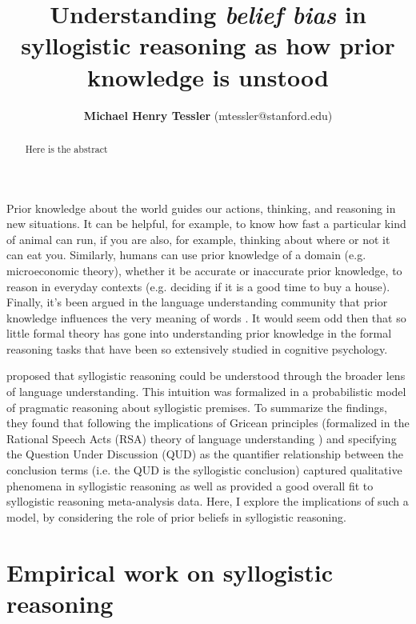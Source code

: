 \documentclass{llncs} %
\title{Understanding \emph{belief bias} in syllogistic reasoning as how prior knowledge is unstood}
\author{{\large \bf Michael Henry Tessler} (mtessler@stanford.edu)}
\institute{Department of Psychology, Stanford University}
\begin{document}
\maketitle


\begin{abstract}
Here is the abstract
\end{abstract}

Prior knowledge about the world guides our actions, thinking, and reasoning in new situations. It can be helpful, for example, to know how fast a particular kind of animal can run, if you are also, for example, thinking about where or not it can eat you. Similarly, humans can use prior knowledge of a domain (e.g. microeconomic theory), whether it be accurate or inaccurate prior knowledge, to reason in everyday contexts  (e.g. deciding if it is a good time to buy a house). Finally, it's been argued in the language understanding community that prior knowledge influences the very meaning of words \cite{LassGood2015}. It would seem odd then that so little formal theory has gone into understanding prior knowledge in the formal reasoning tasks that have been so extensively studied in cognitive psychology. 

 proposed that syllogistic reasoning could be understood through the broader lens of language understanding. This intuition was formalized in a probabilistic model of pragmatic reasoning about syllogistic premises. To summarize the findings, they found that following the implications of Gricean principles (formalized in the Rational Speech Acts (RSA) theory of language understanding \cite{Frank2012; Goodman2013}) and specifying the Question Under Discussion (QUD) as the quantifier relationship between the conclusion terms (i.e. the QUD is the syllogistic conclusion) captured qualitative phenomena in syllogistic reasoning as well as provided a good overall fit to syllogistic reasoning meta-analysis data. Here, I explore the implications of such a model, by considering the role of prior beliefs in syllogistic reasoning.

\section{Empirical work on syllogistic reasoning}
\end{document}
